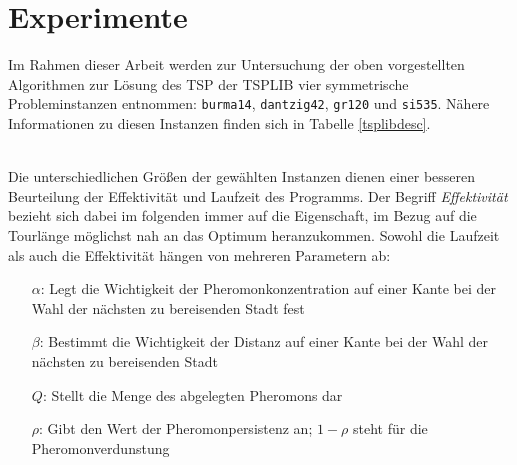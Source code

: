 \documentclass[doktyp=barbeit, sprache=german]{TUBAFarbeiten}
\begin{document}
\newpage\section{Experimente}
\label{sec:vorgehensweise}
Im Rahmen dieser Arbeit werden zur Untersuchung der oben vorgestellten Algorithmen zur Lösung des TSP der TSPLIB vier symmetrische Probleminstanzen entnommen: \texttt{burma14}, \texttt{dantzig42}, \texttt{gr120} und \texttt{si535}. Nähere Informationen zu diesen Instanzen finden sich in Tabelle \ref{tsplibdesc}.
\begin{table}[]
\centering
{}
\caption{Übersicht über die untersuchten TSPLIB-Instanzen mit Angaben zur Anzahl der Städte, Tourlängenoptimum und Art des Problems}
\label{tsplibdesc}
\end{table}
\\Die unterschiedlichen Größen der gewählten Instanzen dienen einer besseren Beurteilung der Effektivität und Laufzeit des Programms.
Der Begriff \textit{Effektivität} bezieht sich dabei im folgenden immer auf die Eigenschaft, im Bezug auf die Tourlänge möglichst nah an das Optimum heranzukommen. Sowohl die Laufzeit als auch die Effektivität hängen von mehreren Parametern ab:
\begin{itemize}
\item[$\alpha$:] Legt die Wichtigkeit der Pheromonkonzentration auf einer Kante bei der Wahl der nächsten zu bereisenden Stadt fest
\item[$\beta$:] Bestimmt die Wichtigkeit der Distanz auf einer Kante bei der Wahl der nächsten zu bereisenden Stadt 
\item[$Q$:] Stellt die Menge des abgelegten Pheromons dar
\item[$\rho$:] Gibt den Wert der Pheromonpersistenz an; $1 - \rho$ steht für die Pheromonverdunstung
\end{itemize}
\end{document}
